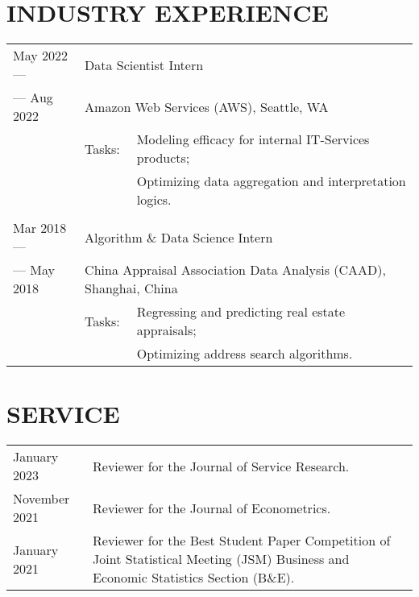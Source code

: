 \documentclass[pdftex,11pt]{article}	%
\begin{document}
\section*{INDUSTRY EXPERIENCE}
\begin{tabularx}{\textwidth}{@{} p{2.7cm}  p{1.5cm} X @{}}
	May 2022 --- & \multicolumn{2}{l}{Data Scientist Intern} \\
	\hfill --- Aug 2022 & \multicolumn{2}{l}{Amazon Web Services (AWS), Seattle, WA} \\
	& Tasks: & Modeling efficacy for internal IT-Services products; \\ 
	& & Optimizing data aggregation and interpretation logics. \\
	& & \\
	Mar 2018 --- & \multicolumn{2}{l}{Algorithm \& Data Science Intern} \\
	\hfill --- May 2018 & \multicolumn{2}{l}{China Appraisal Association Data Analysis (CAAD), Shanghai, China} \\
	& Tasks: & Regressing and predicting real estate appraisals; \\
	& & Optimizing address search algorithms.
\end{tabularx}

\else
\newpage
\section*{SERVICE}
\begin{tabularx}{\textwidth}{ @{} p{2.7cm}  X  @{}} 
	January 2023 & Reviewer for the Journal of Service Research. \\
	November 2021 & Reviewer for the Journal of Econometrics. \\
	January 2021 & Reviewer for the Best Student Paper Competition of Joint Statistical Meeting (JSM) Business and Economic Statistics Section (B\&E).
\end{tabularx}
\fi
\end{document}
